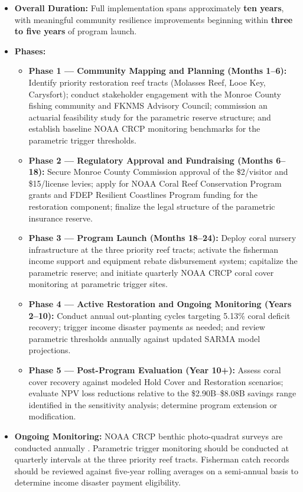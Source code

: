 \documentclass[10pt,letterpaper]{article}
\newcounter{metric}
\newcounter{gs}
\begin{document}
\begin{itemize}

    \item \textbf{Overall Duration:} Full implementation spans approximately \textbf{ten years}, with meaningful community resilience improvements beginning within \textbf{three to five years} of program launch.

    \item \textbf{Phases:}
    \begin{itemize}
        \item \textbf{Phase 1 --- Community Mapping and Planning (Months 1--6):} Identify priority restoration reef tracts (Molasses Reef, Looe Key, Carysfort); conduct stakeholder engagement with the Monroe County fishing community and FKNMS Advisory Council; commission an actuarial feasibility study for the parametric reserve structure; and establish baseline NOAA CRCP monitoring benchmarks for the parametric trigger thresholds.
        \item \textbf{Phase 2 --- Regulatory Approval and Fundraising (Months 6--18):} Secure Monroe County Commission approval of the \$2/visitor and \$15/license levies; apply for NOAA Coral Reef Conservation Program grants and FDEP Resilient Coastlines Program funding for the restoration component; finalize the legal structure of the parametric insurance reserve.
        \item \textbf{Phase 3 --- Program Launch (Months 18--24):} Deploy coral nursery infrastructure at the three priority reef tracts; activate the fisherman income support and equipment rebate disbursement system; capitalize the parametric reserve; and initiate quarterly NOAA CRCP coral cover monitoring at parametric trigger sites.
        \item \textbf{Phase 4 --- Active Restoration and Ongoing Monitoring (Years 2--10):} Conduct annual out-planting cycles targeting 5.13\% coral deficit recovery; trigger income disaster payments as needed; and review parametric thresholds annually against updated SARMA model projections.
        \item \textbf{Phase 5 --- Post-Program Evaluation (Year 10+):} Assess coral cover recovery against modeled Hold Cover and Restoration scenarios; evaluate NPV loss reductions relative to the \$2.90B--\$8.08B savings range identified in the sensitivity analysis; determine program extension or modification.
    \end{itemize}

    \item \textbf{Ongoing Monitoring:} NOAA CRCP benthic photo-quadrat surveys are conducted annually \cite{noaa_ncrmp}. Parametric trigger monitoring should be conducted at quarterly intervals at the three priority reef tracts. Fisherman catch records should be reviewed against five-year rolling averages on a semi-annual basis to determine income disaster payment eligibility.


\end{itemize}
\end{document}
